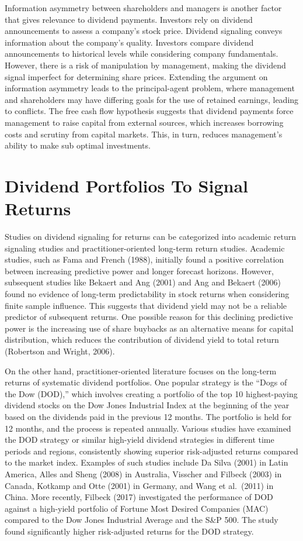 \documentclass[
]{article}
\begin{document}
Information asymmetry between shareholders and managers is another
factor that gives relevance to dividend payments. Investors rely on
dividend announcements to assess a company's stock price. Dividend
signaling conveys information about the company's quality. Investors
compare dividend announcements to historical levels while considering
company fundamentals. However, there is a risk of manipulation by
management, making the dividend signal imperfect for determining share
prices. Extending the argument on information asymmetry leads to the
principal-agent problem, where management and shareholders may have
differing goals for the use of retained earnings, leading to conflicts.
The free cash flow hypothesis suggests that dividend payments force
management to raise capital from external sources, which increases
borrowing costs and scrutiny from capital markets. This, in turn,
reduces management's ability to make sub optimal investments.

\hypertarget{dividend-portfolios-to-signal-returns}{%
\section{Dividend Portfolios To Signal
Returns}\label{dividend-portfolios-to-signal-returns}}

Studies on dividend signaling for returns can be categorized into
academic return signaling studies and practitioner-oriented long-term
return studies. Academic studies, such as Fama and French (1988),
initially found a positive correlation between increasing predictive
power and longer forecast horizons. However, subsequent studies like
Bekaert and Ang (2001) and Ang and Bekaert (2006) found no evidence of
long-term predictability in stock returns when considering finite sample
influence. This suggests that dividend yield may not be a reliable
predictor of subsequent returns. One possible reason for this declining
predictive power is the increasing use of share buybacks as an
alternative means for capital distribution, which reduces the
contribution of dividend yield to total return (Robertson and Wright,
2006).

On the other hand, practitioner-oriented literature focuses on the
long-term returns of systematic dividend portfolios. One popular
strategy is the ``Dogs of the Dow (DOD),'' which involves creating a
portfolio of the top 10 highest-paying dividend stocks on the Dow Jones
Industrial Index at the beginning of the year based on the dividends
paid in the previous 12 months. The portfolio is held for 12 months, and
the process is repeated annually. Various studies have examined the DOD
strategy or similar high-yield dividend strategies in different time
periods and regions, consistently showing superior risk-adjusted returns
compared to the market index. Examples of such studies include Da Silva
(2001) in Latin America, Alles and Sheng (2008) in Australia, Visscher
and Filbeck (2003) in Canada, Kotkamp and Otte (2001) in Germany, and
Wang et al.~(2011) in China. More recently, Filbeck (2017) investigated
the performance of DOD against a high-yield portfolio of Fortune Most
Desired Companies (MAC) compared to the Dow Jones Industrial Average and
the S\&P 500. The study found significantly higher risk-adjusted returns
for the DOD strategy.
\end{document}
